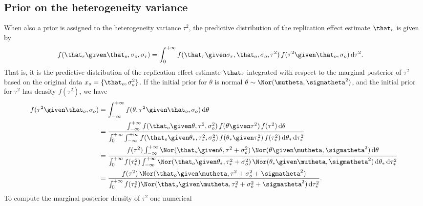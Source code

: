 \begin{subappendices}
\subsection{Prior on the heterogeneity variance}
\label{sec:priortau}
When also a prior is assigned to the heterogeneity variance $\tau^{2}$, the
predictive distribution of the replication effect estimate $\that_{r}$ is given
by
\begin{align*}
  f(\that_{r} \given \that_{o}, \sigma_{o}, \sigma_{r})
  &= \int_{0}^{+\infty} f(\that_{r} \given \sigma_{r}, \that_{o}, \sigma_{o},
    \tau^{2}) \,
    f(\tau^{2} \given \that_{o}, \sigma_{o}) \, \text{d}\tau^{2}.
\end{align*}
That is, it is the predictive distribution of the replication effect estimate
$\that_{r}$ integrated with respect to the marginal posterior of $\tau^{2}$
based on the original data $x_{o} = \{\that_{o}, \sigma^{2}_{o}\}$. If the
initial prior for $\theta$ is normal
$\theta \sim \Nor(\mutheta, \sigmatheta^{2})$, and the initial prior for
$\tau^{2}$ has density $f(\tau^{2})$, we have
\begin{align*}
  f(\tau^{2} \given \that_{o}, \sigma_{o})
  &= \int_{-\infty}^{+\infty} f(\theta, \tau^{2} \given \that_{o}, \sigma_{o}) \, \text{d}\theta \\
  &= \frac{\int_{-\infty}^{+\infty} f(\that_{o} \given \theta, \tau^{2}, \sigma^{2}_{o}) \,
    f(\theta \given \tau^{2}) \, f(\tau^{2}) \, \text{d}\theta}{\int_{0}^{+\infty}
    \int_{-\infty}^{+\infty} f(\that_{o} \given \theta_{*}, \tau^{2}_{*}, \sigma^{2}_{o}) \,
    f(\theta_{*} \given \tau^{2}_{*}) \, f(\tau^{2}_{*}) \, \text{d}\theta_{*} \,
    \text{d}\tau^{2}_{*}} \\
  &= \frac{f(\tau^{2}) \int_{-\infty}^{+\infty} \Nor(\that_{o} \given \theta, \tau^{2}
    + \sigma^{2}_{o}) \, \Nor(\theta \given \mutheta, \sigmatheta^{2}) \,\text{d}\theta
    }{\int_{0}^{+\infty} f(\tau^{2}_{*})
    \int_{-\infty}^{+\infty} \Nor(\that_{o} \given \theta_{*}, \tau^{2}_{*} + \sigma^{2}_{o}) \,
    \Nor(\theta_{*} \given \mutheta, \sigmatheta^{2}) \, \text{d}\theta_{*} \,
    \text{d}\tau^{2}_{*}} \\
  &= \frac{f(\tau^{2}) \, \Nor(\that_{o} \given \mutheta, \tau^{2}
    + \sigma^{2}_{o} + \sigmatheta^{2})
    }{\int_{0}^{+\infty} f(\tau^{2}_{*})
    \Nor(\that_{o} \given \mutheta, \tau^{2}_{*} + \sigma^{2}_{o} + \sigmatheta^{2}) \,
    \text{d}\tau^{2}_{*}}.
\end{align*}
To compute the marginal posterior density of $\tau^{2}$ one numerical

\end{subappendices}
